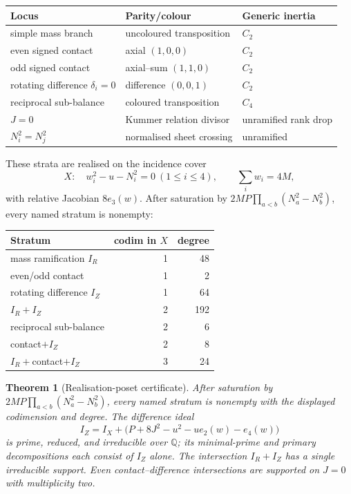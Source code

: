 \documentclass[11pt,a4paper]{article}
\newtheorem{theorem}{Theorem}[section]
\theoremstyle{definition}
\theoremstyle{remark}
\newcommand{\Q}{\mathbb{Q}}
\begin{document}
\begin{center}
\begin{tabular}{@{}lll@{}}
\toprule
Locus & Parity/colour & Generic inertia\\
\midrule
simple mass branch & uncoloured transposition & \(C_2\)\\
even signed contact & axial \((1,0,0)\) & \(C_2\)\\
odd signed contact & axial--sum \((1,1,0)\) & \(C_2\)\\
rotating difference \(\delta_i=0\) & difference \((0,0,1)\) & \(C_2\)\\
reciprocal sub-balance & coloured transposition & \(C_4\)\\
\(J=0\) & Kummer relation divisor & unramified rank drop\\
\(N_i^2=N_j^2\) & normalised sheet crossing & unramified\\
\bottomrule
\end{tabular}
\end{center}

These strata are realised on the incidence cover
\begin{equation}
X:\quad w_i^2-u-N_i^2=0\ (1\le i\le4),\qquad \sum_iw_i=4M,
\label{eq:incidence}
\end{equation}
with relative Jacobian \(8e_3(w)\). After saturation by
\(2MP\prod_{a<b}(N_a^2-N_b^2)\), every named stratum is nonempty:

\begin{center}
\begin{tabular}{@{}lrr@{}}
\toprule
Stratum & codim in \(X\) & degree\\
\midrule
mass ramification \(I_R\) & 1 & 48\\
even/odd contact & 1 & 2\\
rotating difference \(I_Z\) & 1 & 64\\
\(I_R+I_Z\) & 2 & 192\\
reciprocal sub-balance & 2 & 6\\
contact\(+I_Z\) & 2 & 8\\
\(I_R+\)contact\(+I_Z\) & 3 & 24\\
\bottomrule
\end{tabular}
\end{center}

\begin{theorem}[Realisation-poset certificate]
\label{thm:realization}
After saturation by \(2MP\prod_{a<b}(N_a^2-N_b^2)\), every named stratum is
nonempty with the displayed codimension and degree. The difference ideal
\begin{equation}
I_Z=I_X+\bigl(P+8J^2-u^2-ue_2(w)-e_4(w)\bigr)
\label{eq:iz}
\end{equation}
is prime, reduced, and irreducible over \(\Q\); its minimal-prime and primary
decompositions each consist of \(I_Z\) alone. The intersection \(I_R+I_Z\) has a
single irreducible support. Even contact--difference intersections are
supported on \(J=0\) with multiplicity two.
\end{theorem}
\end{document}
